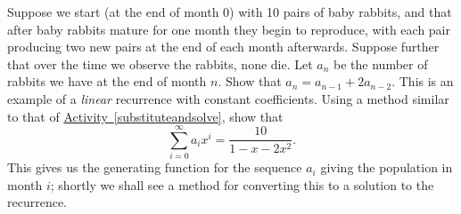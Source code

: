 \documentclass{book}
\begin{document}
\setcounter{cpjt}{260}
\addtocounter{cpjt}{-1}
\begin{activity}\label{secondorderintroduction}
\hypertarget{p-1345}{}%
Suppose we start (at the end of month 0) with 10 pairs of baby rabbits, and that after baby rabbits mature for one month they begin to reproduce, with each pair producing two new pairs at the end of each month afterwards. Suppose further that over the time we observe the rabbits, none die. Let \(a_n\) be the number of rabbits we have at the end of month \(n\). Show that \(a_n=a_{n-1} + 2a_{n-2}\). This is an example of a  \emph{linear} recurrence with constant coefficients. Using a method similar to that of \hyperref[substituteandsolve]{Activity~\ref{substituteandsolve}}, show that%
\begin{equation*}
\sum_{i=0}^\infty a_ix^i = \frac{10}{1-x-2x^2}.
\end{equation*}
This gives us the generating function for the sequence \(a_i\) giving the population in month \(i\); shortly we shall see a method for converting this to a solution to the recurrence.%
\par\smallskip%
\noindent\end{activity}

\clearpage
\end{document}
